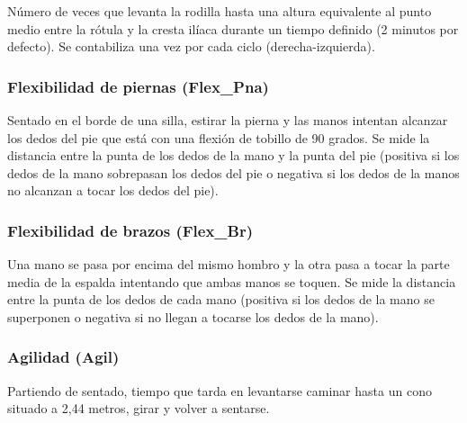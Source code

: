 Número de veces que levanta la rodilla hasta una altura equivalente al punto medio entre la rótula y la cresta ilíaca durante un tiempo definido (2 minutos por defecto). Se contabiliza una vez por cada ciclo (derecha-izquierda).


\subsubsection{Flexibilidad de piernas (Flex\_Pna)}

Sentado en el borde de una silla, estirar la pierna y las manos intentan alcanzar los dedos del pie que está con una flexión de tobillo de 90 grados. Se mide la distancia entre la punta de los dedos de la mano y la punta del pie (positiva si los dedos de la mano sobrepasan los dedos del pie o negativa si los dedos de la manos no alcanzan a tocar los dedos del pie).


\subsubsection{Flexibilidad de brazos (Flex\_Br)}

Una mano se pasa por encima del mismo hombro y la otra pasa a tocar la parte media de la espalda intentando que ambas manos se toquen. Se mide la distancia entre la punta de los dedos de cada mano (positiva si los dedos de la mano se superponen o negativa si no llegan a tocarse los dedos de la mano).


\subsubsection{Agilidad (Agil)}

Partiendo de sentado, tiempo que tarda en levantarse caminar hasta un cono situado a 2,44 metros, girar y volver a sentarse.

